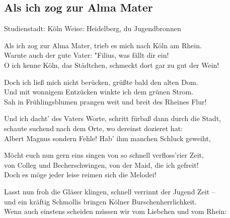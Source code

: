 
\subsection*{Als ich zog zur Alma Mater}
%
%

\hfill%
Studienstadt: Köln
Weise: Heidelberg, du Jugendbronnen%

\thestrophe Als ich zog zur Alma Mater, trieb es mich nach Köln am Rhein. \\
Warnte auch der gute Vater: "Filius, was fällt dir ein! \\
O ich kenne Köln, das Städtchen, schmeckt dort gar zu gut der Wein! \\

\thestrophe Doch ich ließ mich nicht berücken, grüßte bald den alten Dom. \\
Und mit wonnigem Entzücken winkte ich dem grünen Strom. \\
Sah in Frühlingsblumen prangen weit und breit des Rheines Flur! \\

\thestrophe Und ich dacht' des Vaters Worte, schritt fürbaß dann durch die Stadt, \\
schaute suchend nach dem Orte, wo dereinst dozieret hat: \\
Albert Magnus sondern Fehle! Hab' ihm manchen Schluck geweiht, \\

\thestrophe Möcht euch nun gern eins singen von so schnell verfloss'rier Zeit, \\
von Colleg und Becherschwingen, von der Maid, die ich gefreit! \\
Doch es möge jeder leise reimen sich die Melodei! \\

\thestrophe Lasst nun froh die Gläser klingen, schnell verrinnt der Jugend Zeit – \\
und ein kräftig Schmollis bringen Kölner Burschenherrlichkeit.\\
Wenn auch einstens scheiden müssen wir vom Liebchen und vom Rhein: \\

